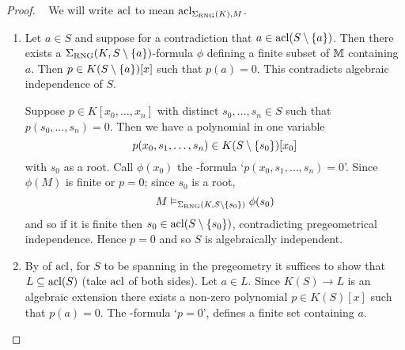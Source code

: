 \begin{proof}~
    We will write $\operatorname{acl}$ to mean $\operatorname{acl}_{\Sigma_{\mathrm{RNG}}(K),M}$.
    \begin{enumerate}
        \item \begin{forward}
            Let $a \in S$ and suppose for a contradiction that 
            $a \in \operatorname{acl}(S \setminus \left\{a\right\})$.
            Then there exists a $\Sigma_{\mathrm{RNG}}(K,S \setminus \left\{a\right\})$-formula $\phi$
            defining a finite subset of $\mathbb{M}$ containing $a$.
            Then  
            $p \in K(S \setminus \left\{a\right\})[x]$ such that 
            $p(a) = 0$.
            This contradicts algebraic independence of $S$.
        \end{forward}

        \begin{backward}
            Suppose $p \in K[x_0,\dots,x_n]$ with distinct $s_0,\dots,s_n \in S$
            such that $p(s_0,\dots,s_n) = 0$.
            Then we have a polynomial in one variable
            \[p(x_0,s_1,\dots,s_n) \in K(S \setminus \left\{s_0\right\})[x_0]\]
            with $s_0$ as a root.
            Call $\phi(x_0)$ 
            the -formula 
            `$p(x_0,s_1,\dots,s_n) = 0$'.
            Since 
             $\phi(M)$
            is finite or $p = 0$; since $s_0$ is a root, 
            \[M \vDash_{\Sigma_{\mathrm{RNG}} (K,S \setminus \left\{s_0\right\})} \phi(s_0)\]
            and so if it is finite then $s_0 \in \operatorname{acl}(S \setminus \left\{s_0\right\})$,
            contradicting pregeometrical independence.
            Hence $p = 0$ and so $S$ is algebraically independent.
        \end{backward}
        \item \begin{forward}
            By  of $\operatorname{acl}$, 
            for $S$ to be spanning in the pregeometry 
            it suffices to show that $L \subseteq \operatorname{acl}(S)$ 
            (take $\operatorname{acl}$ of both sides).
            Let $a \in L$.
            Since $K(S) \to L$ is an algebraic extension 
            there exists a non-zero polynomial 
            $p \in K(S)[x]$ such that $p(a) = 0$.
            The -formula `$p = 0$',
            defines a finite set containing $a$.
        \end{forward}
        

\end{enumerate}
\end{proof}
